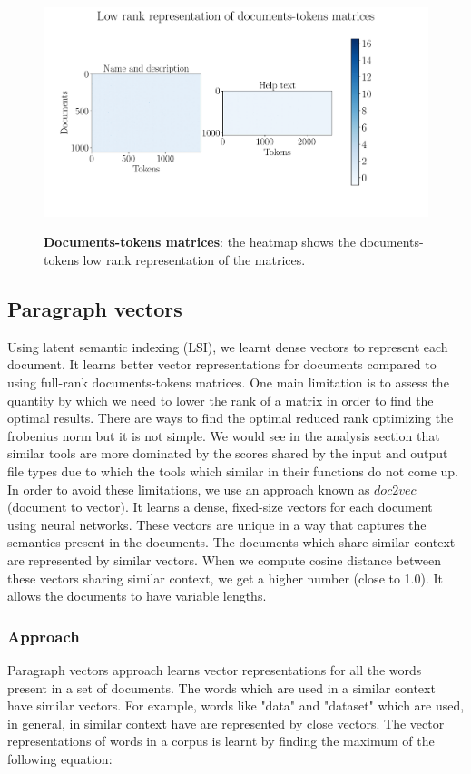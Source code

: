 \begin{figure}[h]
\begin{centering}
    {\includegraphics[scale=0.45]{figures/Document_tokens_low_rank.pdf}}
    \caption[Documents-tokens matrices]{\textbf{Documents-tokens matrices}: the heatmap shows the documents-tokens low rank representation of the matrices.}
\end{centering}
\end{figure}

\subsection{Paragraph vectors}
Using latent semantic indexing (LSI), we learnt dense vectors to represent each document. It learns better vector representations for documents compared to using full-rank documents-tokens matrices. One main limitation is to assess the quantity by which we need to lower the rank of a matrix in order to find the optimal results. There are ways to find the optimal reduced rank optimizing the frobenius norm but it is not simple. We would see in the analysis section that similar tools are more dominated by the scores shared by the input and output file types due to which the tools which similar in their functions do not come up. In order to avoid these limitations, we use an approach known as $doc2vec$ (document to vector). It learns a dense, fixed-size vectors for each document using neural networks. These vectors are unique in a way that captures the semantics present in the documents. The documents which share similar context are represented by similar vectors. When we compute cosine distance between these vectors sharing similar context, we get a higher number (close to 1.0). It allows the documents to have variable lengths.

\subsubsection{Approach}
Paragraph vectors approach learns vector representations for all the words present in a set of documents. The words which are used in a similar context have similar vectors. For example, words like "data" and "dataset" which are used, in general, in similar context have are represented by close vectors. The vector representations of words in a corpus is learnt by finding the maximum of the following equation:

